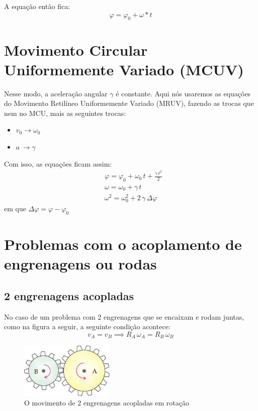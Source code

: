 \documentclass[12pt]{extarticle}
\newcommand{\<}{\langle}
\renewcommand{\>}{\rangle}
\theoremstyle{definition}
\begin{document}
A equação então fica:
\begin{equation}
    \varphi = \varphi_0 + \omega*t
\end{equation}

\section{Movimento Circular Uniformemente Variado (MCUV)}

Nesse modo, a aceleração angular $\gamma$ é constante. Aqui nós usaremos as equações do Movimento Retilíneo Uniformemente Variado (MRUV), fazendo as trocas que nem no MCU, mais as seguintes trocas:
\begin{itemize}
    \item $v_0\rightarrow \omega_0$
    \item $a\,\rightarrow \gamma$
\end{itemize}

Com isso, as equações ficam assim:
\begin{align}
    &\varphi = \varphi_0 + \omega_0\,t + \frac{\gamma\,t^2}{2}\\
    &\omega = \omega_0 +\gamma\,t\\
    &\omega^2 = \omega_0^2 + 2\,\gamma\,\Delta\varphi
\end{align}
\noindent em que $\Delta\varphi = \varphi - \varphi_0$

\section{Problemas com o acoplamento de engrenagens ou rodas}

\subsection{2 engrenagens acopladas}
No caso de um problema com 2 engrenagens que se encaixam e rodam juntas, como na figura a seguir, a seguinte condição acontece: \begin{equation}
    v_A = v_B \implies R_A\,\omega_A = R_B\,\omega_B
\end{equation}
\begin{figure}[H]
    \centering
    \includegraphics[width=0.4\textwidth]{engrenagens.jpg}
    \caption{O movimento de 2 engrenagens acopladas em rotação}
    \label{fig:engrenagens}
\end{figure}
\end{document}

